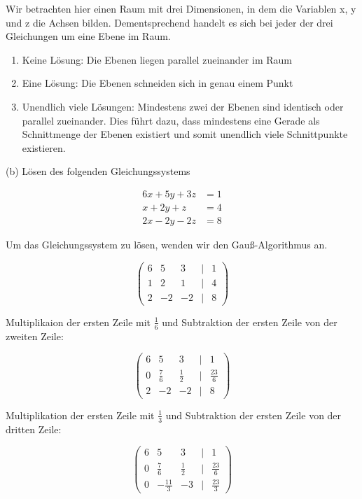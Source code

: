 \documentclass[11pt]{article}
\begin{document}
Wir betrachten hier einen Raum mit drei Dimensionen, in dem die Variablen x, y und z die Achsen bilden.
Dementsprechend handelt es sich bei jeder der drei Gleichungen um eine Ebene im Raum.

\begin{enumerate}
    \item  Keine Lösung: Die Ebenen liegen parallel zueinander im Raum
    \item  Eine Lösung: Die Ebenen schneiden sich in genau einem Punkt
    \item  Unendlich viele Lösungen: Mindestens zwei der Ebenen sind identisch oder parallel zueinander. Dies führt dazu, dass mindestens eine Gerade als Schnittmenge der Ebenen existiert und somit unendlich viele Schnittpunkte existieren.
\end{enumerate}
\bigskip

(b) Lösen des folgenden Gleichungssystems

\[
\begin{aligned}
    6x + 5y + 3z & = 1 \\
    x + 2y + z & = 4 \\
    2x - 2y - 2z & = 8
\end{aligned}
\]
\bigskip

Um das Gleichungssystem zu lösen, wenden wir den Gauß-Algorithmus an.

\[
\begin{pmatrix}
    6 & 5 & 3 & | & 1 \\
    1 & 2 & 1 & | & 4 \\
    2 & -2 & -2 & | & 8
\end{pmatrix}
\]

Multiplikaion der ersten Zeile mit $\frac{1}{6}$ und Subtraktion der ersten Zeile von der zweiten Zeile:

\[
\begin{pmatrix}
    6 & 5 & 3 & | & 1 \\
    0 & \frac{7}{6} & \frac{1}{2} & | & \frac{23}{6} \\
    2 & -2 & -2 & | & 8
\end{pmatrix}
\]

Multiplikation der ersten Zeile mit $\frac{1}{3}$ und Subtraktion der ersten Zeile von der dritten Zeile:

\[
\begin{pmatrix}
    6 & 5 & 3 & | & 1 \\
    0 & \frac{7}{6} & \frac{1}{2} & | & \frac{23}{6} \\
    0 & -\frac{11}{3} & -3 & | & \frac{23}{3}
\end{pmatrix}
\]
\end{document}
